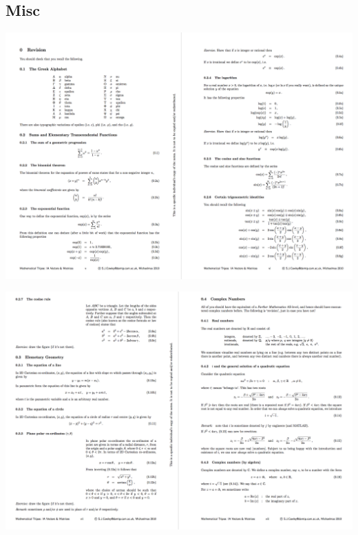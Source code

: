 \subsection{Misc}
\begin{mdframed}
  \includegraphics[width=400pt]{img/misc--cambridge-1a-vectors-and-matrices-revision-1.png}
\end{mdframed}
\begin{mdframed}
  \includegraphics[width=400pt]{img/misc--cambridge-1a-vectors-and-matrices-revision-2.png}
\end{mdframed}

